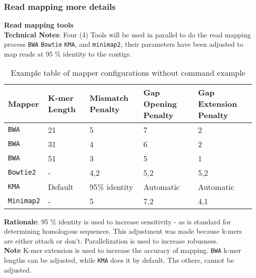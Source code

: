 \documentclass[11pt]{report}
\begin{document}
\begin{itemize}
		\subsubsection{Read mapping more details}
	\textbf {Read mapping tools} \\
	\textbf{Technical Notes}: Four (4) Tools will be used in parallel to do the read mapping process \texttt{BWA} \texttt{Bowtie} \texttt{KMA}, and \texttt{minimap2}, their parameters have been adjusted to map reads at 95 \% identity to the contigs.  \\
	
\begin{table}[h!]
	\centering
	\begin{adjustbox}{max width=\linewidth}
		\begin{tabular}{|p{3cm}|p{3cm}|p{3cm}|p{3cm}|p{3cm}|}
			\hline
			\textbf{Mapper} & \textbf{K-mer Length} & \textbf{Mismatch Penalty} & \textbf{Gap Opening Penalty} & \textbf{Gap Extension Penalty} \\ \hline
			\texttt{BWA} & 21 & 5 & 7 & 2 \\ \hline
			\texttt{BWA} & 31 & 4 & 6 & 2 \\ \hline
			\texttt{BWA} & 51 & 3 & 5 & 1 \\ \hline
			\texttt{Bowtie2} & - & 4,2 & 5,2 & 5,2 \\ \hline
			\texttt{KMA} & Default & 95\% identity & Automatic & Automatic \\ \hline
			\texttt{Minimap2} & - & 5 & 7,2 & 4,1 \\ \hline
		\end{tabular}
	\end{adjustbox}
	\caption{Example table of mapper configurations without command example}
	\label{tab:mapper_configurations}
\end{table}
	
	\textbf{Rationale}: 95 \% identity is used to increase sensitivity - as is standard for determining homologous sequences. This adjustment was made because k-mers are either attach or don't. Parallelization is used to increase robusness.\\
	\textbf{Note} K-mer extension is used to increase the accuracy of mapping. \texttt{BWA} k-mer lengths can be adjusted, while \texttt{KMA} does it by default. The others, cannot be adjusted. \\
	

\end{itemize}
\end{document}
